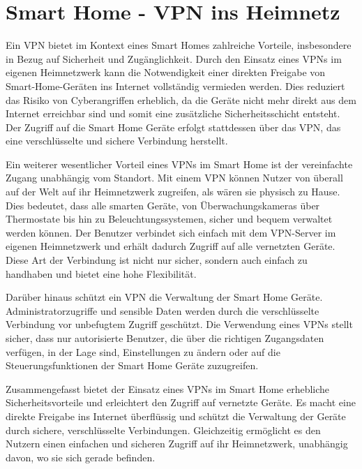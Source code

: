 \section{Smart Home - \gls{VPN} ins Heimnetz} \label{vpn-home}
Ein \gls{VPN} bietet im Kontext eines Smart Homes zahlreiche Vorteile, insbesondere in Bezug auf Sicherheit und Zugänglichkeit. Durch den Einsatz eines \gls{VPN}s im eigenen Heimnetzwerk kann die Notwendigkeit einer direkten Freigabe von Smart-Home-Geräten ins Internet vollständig vermieden werden. Dies reduziert das Risiko von Cyberangriffen erheblich, da die Geräte nicht mehr direkt aus dem Internet erreichbar sind und somit eine zusätzliche Sicherheitsschicht entsteht.  Der Zugriff auf die Smart Home Geräte erfolgt stattdessen über das \gls{VPN}, das eine verschlüsselte und sichere Verbindung herstellt. \cite{jeliskoski2018securing, Klein-Hennig2017-ia}

Ein weiterer wesentlicher Vorteil eines \gls{VPN}s im Smart Home ist der vereinfachte Zugang unabhängig vom Standort. Mit einem \gls{VPN} können Nutzer von überall auf der Welt auf ihr Heimnetzwerk zugreifen, als wären sie physisch zu Hause. Dies bedeutet, dass alle smarten Geräte, von Überwachungskameras über Thermostate bis hin zu Beleuchtungssystemen, sicher und bequem verwaltet werden können. Der Benutzer verbindet sich einfach mit dem VPN-Server im eigenen Heimnetzwerk und erhält dadurch Zugriff auf alle vernetzten Geräte. Diese Art der Verbindung ist nicht nur sicher, sondern auch einfach zu handhaben und bietet eine hohe Flexibilität. \cite{Klein-Hennig2017-ia}

Darüber hinaus schützt ein \gls{VPN} die Verwaltung der Smart Home Geräte. Administratorzugriffe und sensible Daten werden durch die verschlüsselte Verbindung vor unbefugtem Zugriff geschützt. Die Verwendung eines \gls{VPN}s stellt sicher, dass nur autorisierte Benutzer, die über die richtigen Zugangsdaten verfügen, in der Lage sind, Einstellungen zu ändern oder auf die Steuerungsfunktionen der Smart Home Geräte zuzugreifen. \cite{jeliskoski2018securing, Klein-Hennig2017-ia} 

Zusammengefasst bietet der Einsatz eines \gls{VPN}s im Smart Home erhebliche Sicherheitsvorteile und erleichtert den Zugriff auf vernetzte Geräte. Es macht eine direkte Freigabe ins Internet überflüssig und schützt die Verwaltung der Geräte durch sichere, verschlüsselte Verbindungen. Gleichzeitig ermöglicht es den Nutzern einen einfachen und sicheren Zugriff auf ihr Heimnetzwerk, unabhängig davon, wo sie sich gerade befinden.